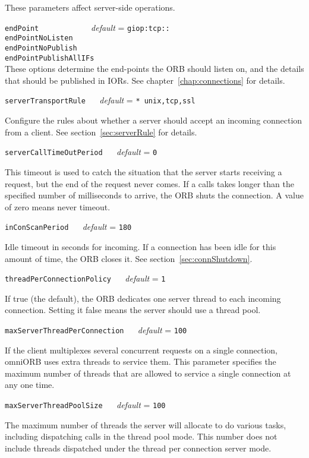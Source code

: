 \documentclass[11pt,twoside,a4paper]{book}
\makeatletter
\newcommand{\code}[1]{\texttt{#1}}
\newcommand{\confopt}[2]
  {\vspace{\baselineskip}\par\noindent\code{#1} ~~ \textit{default} =
   \code{#2}\\[-1ex]\@afterheading}
\makeatother
\begin{document}
These parameters affect server-side operations.


\vspace{\baselineskip}

\noindent
\code{endPoint~~~~~~~~~} ~~ \textit{default} = \code{giop:tcp::}\\
\code{endPointNoListen}\\
\code{endPointNoPublish}\\
\code{endPointPublishAllIFs}\\[.1ex]

\noindent
These options determine the end-points the ORB should listen on, and
the details that should be published in IORs. See
chapter~\ref{chap:connections} for details.



\confopt{serverTransportRule}{* unix,tcp,ssl}

Configure the rules about whether a server should accept an incoming
connection from a client. See section~\ref{sec:serverRule} for
details.


\confopt{serverCallTimeOutPeriod}{0}

This timeout is used to catch the situation that the server starts
receiving a request, but the end of the request never comes. If a
calls takes longer than the specified number of milliseconds to
arrive, the ORB shuts the connection. A value of zero means never
timeout.


\confopt{inConScanPeriod}{180}

Idle timeout in seconds for incoming. If a connection has been idle
for this amount of time, the ORB closes it. See
section~\ref{sec:connShutdown}.


\confopt{threadPerConnectionPolicy}{1}

If true (the default), the ORB dedicates one server thread to each
incoming connection. Setting it false means the server should use a
thread pool.


\confopt{maxServerThreadPerConnection}{100}

If the client multiplexes several concurrent requests on a single
connection, omniORB uses extra threads to service them. This parameter
specifies the maximum number of threads that are allowed to service a
single connection at any one time.


\confopt{maxServerThreadPoolSize}{100}

The maximum number of threads the server will allocate to do various
tasks, including dispatching calls in the thread pool mode. This
number does not include threads dispatched under the thread per
connection server mode.
\end{document}
